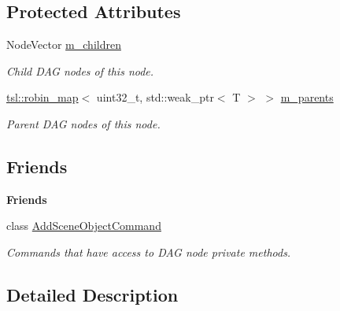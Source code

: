 \subsection*{Protected Attributes}
\begin{DoxyCompactItemize}
\item 
\mbox{\label{classrev_1_1_dag_node_afbd1e96015927229fc3b637553b65c5c}} 
Node\+Vector \mbox{\hyperlink{classrev_1_1_dag_node_afbd1e96015927229fc3b637553b65c5c}{m\+\_\+children}}
\begin{DoxyCompactList}\small\item\em Child D\+AG nodes of this node. \end{DoxyCompactList}\item 
\mbox{\label{classrev_1_1_dag_node_a531899dc060b6ac184b00a853a1e0559}} 
\mbox{\hyperlink{classtsl_1_1robin__map}{tsl\+::robin\+\_\+map}}$<$ uint32\+\_\+t, std\+::weak\+\_\+ptr$<$ T $>$ $>$ \mbox{\hyperlink{classrev_1_1_dag_node_a531899dc060b6ac184b00a853a1e0559}{m\+\_\+parents}}
\begin{DoxyCompactList}\small\item\em Parent D\+AG nodes of this node. \end{DoxyCompactList}\end{DoxyCompactItemize}
\subsection*{Friends}
\begin{Indent}\textbf{ Friends}\par
\begin{DoxyCompactItemize}
\item 
\mbox{\label{classrev_1_1_dag_node_a6dfbfaa4d50dc35d9c9491fd2b09ce23}} 
class \mbox{\hyperlink{classrev_1_1_dag_node_a6dfbfaa4d50dc35d9c9491fd2b09ce23}{Add\+Scene\+Object\+Command}}
\begin{DoxyCompactList}\small\item\em Commands that have access to D\+AG node private methods. \end{DoxyCompactList}\end{DoxyCompactItemize}
\end{Indent}


\subsection{Detailed Description}
